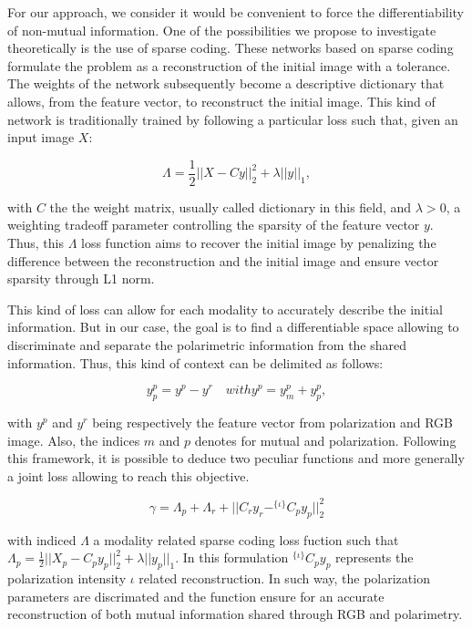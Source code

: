 For our approach, we consider it would be convenient to force the differentiability of non-mutual information.
One of the possibilities we propose to investigate theoretically is the use of sparse coding. These networks based on sparse coding formulate the problem as a reconstruction of the initial image with a tolerance. The weights of the network subsequently become a descriptive dictionary that allows, from the feature vector, to reconstruct the initial image.
This kind of network is traditionally trained by following a particular loss such that, given an input image $X$:

\begin{equation}
	\Lambda = \frac{1}{2} || X - Cy ||^2_2 + \lambda ||y||_1,
\end{equation}

with $C$ the the weight matrix, usually called dictionary in this field, and $\lambda > 0 $, a weighting tradeoff parameter controlling the sparsity of the feature vector $y$. Thus, this $\Lambda$ loss function aims to recover the initial image by penalizing the difference between the reconstruction and the initial image and ensure vector sparsity through L1 norm.

This kind of loss can allow for each modality to accurately describe the initial information. But in our case, the goal is to find a differentiable space allowing to discriminate and separate the polarimetric information from the shared information. Thus, this kind of context can be delimited as follows:

\begin{equation}
	y^p_p = y^p - y^r \quad with y^p = y^p_m + y^p_p,
\end{equation}

with $y^p$ and $y^r$ being respectively the feature vector from polarization and RGB image. Also, the indices $m$ and $p$ denotes for mutual and polarization.
Following this framework, it is possible to deduce two peculiar functions and more generally a joint loss allowing to reach this objective.

\begin{equation}
	\gamma = \Lambda_p + \Lambda_r + ||C_ry_r - ^{\{\iota\}}C_py_p ||^2_2
\end{equation}

with indiced $\Lambda$ a modality related sparse coding loss fuction such that \mbox{$\Lambda_p = \frac{1}{2} || X_p - C_py_p ||^2_2 + \lambda ||y_p||_1$}. In this formulation $^{\{\iota\}}C_py_p$ represents the polarization intensity $\iota$ related reconstruction. In such way, the polarization parameters are discrimated and the function ensure for an accurate reconstruction of both mutual information shared through RGB and polarimetry.


